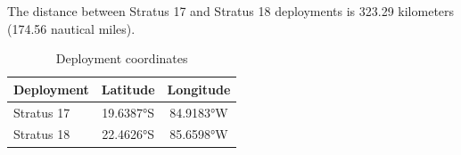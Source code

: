
The distance between Stratus 17 and Stratus 18 deployments is 323.29 kilometers (174.56 nautical miles).

\begin{table}[ht]
\centering
\caption{Deployment coordinates}
\begin{tabular}{lcc}
\hline
\textbf{Deployment} & \textbf{Latitude} & \textbf{Longitude} \\
\hline
Stratus 17 & 19.6387°S & 84.9183°W \\
Stratus 18 & 22.4626°S & 85.6598°W \\
\hline
\end{tabular}
\end{table}
